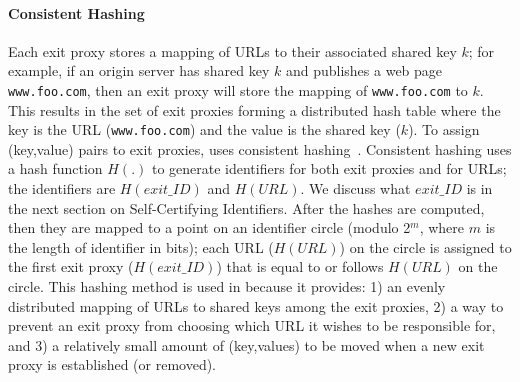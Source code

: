 \paragraph{Consistent Hashing}
Each exit proxy stores a mapping of URLs to their associated shared key $k$; for example, if 
an origin server has shared key $k$ and publishes a web page {\tt www.foo.com}, then an exit 
proxy will store the mapping of {\tt www.foo.com} to $k$.  This results in the set of exit proxies 
forming a distributed hash table where the key is the URL ({\tt www.foo.com}) and the value is the 
shared key ($k$).  To assign (key,value) pairs to exit proxies, \system{} uses consistent 
hashing~\cite{karger1997consistent,lewin1998consistent}.  Consistent hashing uses a hash function $H(.)$
to generate identifiers for both exit proxies and for URLs; the identifiers are $H(exit\_ID)$ and $H(URL)$. 
We discuss what $exit\_ID$ is in the next section on Self-Certifying Identifiers.  After the hashes are 
computed, then they are mapped to a point on an identifier circle (modulo 2$^{m}$, where $m$ is the length of 
identifier in bits); each URL ($H(URL)$) on the circle is assigned to the first exit proxy ($H(exit\_ID)$) that 
is equal to or follows $H(URL)$ on the circle.  This hashing method is used in \system{} because it provides: 
1) an evenly distributed mapping of URLs to shared keys among the exit proxies, 2) a way to prevent an exit 
proxy from choosing which URL it wishes to be responsible for, and 3) a relatively small amount 
of (key,values) to be moved when a new exit proxy is established (or removed).  

